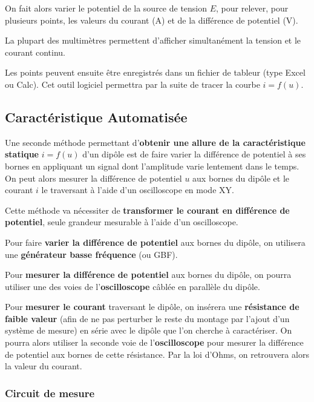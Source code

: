 On fait alors varier le potentiel de la source de tension $E$, pour relever, pour plusieurs points, les valeurs du courant (A) et de la différence de potentiel (V).

La plupart des multimètres permettent d'afficher simultanément la tension et le courant continu.

Les points peuvent ensuite être enregistrés dans un fichier de tableur (type Excel ou Calc). Cet outil logiciel permettra par la suite de tracer la courbe $i=f(u)$.



\subsection*{Caractéristique Automatisée}

Une seconde méthode permettant d'\textbf{obtenir une allure de la caractéristique statique }$i=f(u)$ d'un dipôle est de faire varier la différence de potentiel à ses bornes en appliquant un signal dont l'amplitude varie lentement dans le temps. On peut alors mesurer la différence de potentiel $u$ aux bornes du dipôle et le courant $i$ le traversant à l'aide d'un oscilloscope en mode XY.

Cette méthode va nécessiter de \textbf{transformer le courant en différence de potentiel}, seule grandeur mesurable à l'aide d'un oscilloscope.

Pour faire \textbf{varier la différence de potentiel} aux bornes du dipôle, on utilisera une \textbf{générateur basse fréquence} (ou GBF).

Pour \textbf{mesurer la différence de potentiel} aux bornes du dipôle, on pourra utiliser une des voies de l'\textbf{oscilloscope} câblée en parallèle du dipôle.

Pour \textbf{mesurer le courant} traversant le dipôle, on insérera une \textbf{résistance de faible valeur} (afin de ne pas perturber le reste du montage par l'ajout d'un système de mesure) en série avec le dipôle que l'on cherche à caractériser. On pourra alors utiliser la seconde voie de l'\textbf{oscilloscope} pour mesurer la différence de potentiel aux bornes de cette résistance. Par la loi d'Ohms, on retrouvera alors la valeur du courant.

\subsubsection*{Circuit de mesure}

